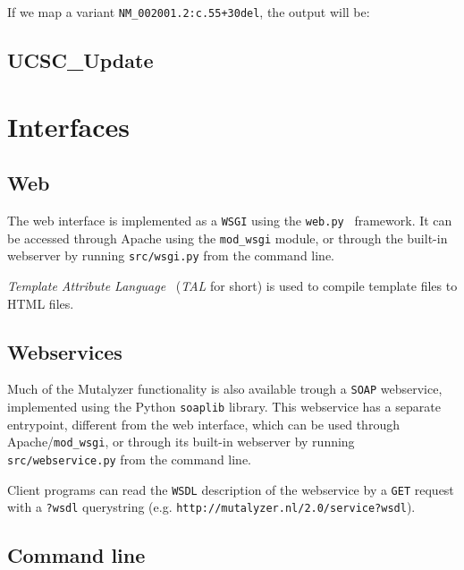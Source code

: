\documentclass{article}
\begin{document}
If we map a variant \texttt{NM\_002001.2:c.55+30del}, the output will be:

\subsection{UCSC\_Update} \label{subsec:ucsc_update}

\newpage

\section{Interfaces} \label{sec:interfaces}

\subsection{Web} \label{subsec:webinterface}

The web interface is implemented as a \texttt{WSGI} using the
\texttt{web.py}~\cite{WEBPY} framework. It can be accessed through Apache
using the \texttt{mod\_wsgi} module, or through the built-in webserver by
running \texttt{src/wsgi.py} from the command line.

\emph{Template Attribute Language}~\cite{TAL} (\emph{TAL} for short) is used
to compile template files to HTML files. %

\subsection{Webservices} \label{subsec:webservinterface}

Much of the Mutalyzer functionality is also available trough a \texttt{SOAP}
webservice, implemented using the Python \texttt{soaplib} library. This
webservice has a separate entrypoint, different from the web interface, which
can be used through Apache/\texttt{mod\_wsgi}, or through its built-in
webserver by running \texttt{src/webservice.py} from the command line.

Client programs can read the \texttt{WSDL} description of the webservice by
a \texttt{GET} request with a \texttt{?wsdl} querystring (e.g.
\texttt{http://mutalyzer.nl/2.0/service?wsdl}).

\subsection{Command line} \label{subsec:commandline}
\end{document}
